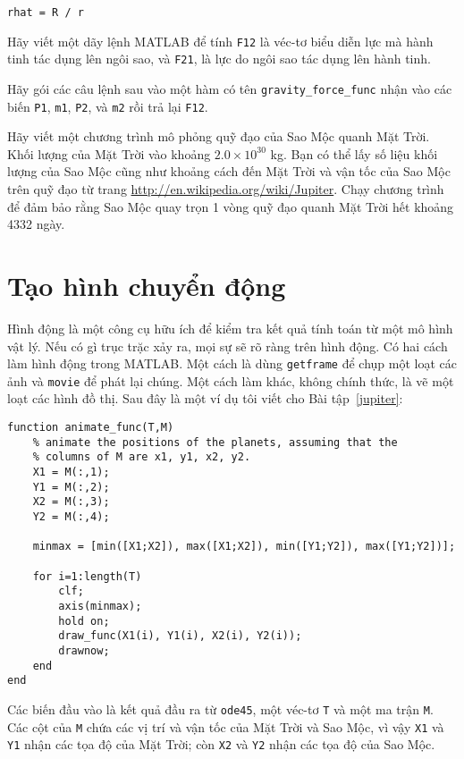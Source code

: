 \documentclass[12pt]{book}
\begin{document}
\begin{verbatim}
rhat = R / r
\end{verbatim}

\begin{ex}
Hãy viết một dãy lệnh MATLAB để tính {\tt F12} là véc-tơ biểu diễn 
lực mà hành tinh tác dụng lên ngôi sao, và {\tt F21}, là lực do 
ngôi sao tác dụng lên hành tinh.
\end{ex}

\begin{ex}
Hãy gói các câu lệnh sau vào một hàm có tên \verb#gravity_force_func#
nhận vào các biến {\tt P1}, {\tt m1}, {\tt P2}, và {\tt m2} rồi trả lại {\tt F12}.
\end{ex}

\begin{ex}
\label{jupiter}
Hãy viết một chương trình  mô phỏng quỹ đạo của Sao Mộc quanh
Mặt Trời. Khối lượng của Mặt Trời vào khoảng $2.0 \times 10^{30}$ kg. 
Bạn có thể lấy số liệu khối lượng của Sao Mộc cũng như khoảng cách
đến Mặt Trời và vận tốc của Sao Mộc trên quỹ đạo từ trang 
\url{http://en.wikipedia.org/wiki/Jupiter}. Chạy chương trình để
đảm bảo rằng Sao Mộc quay trọn 1 vòng quỹ đạo quanh Mặt Trời
hết khoảng 4332 ngày.
\end{ex}


\section{Tạo hình chuyển động}

Hình động là một công cụ hữu ích để kiểm tra kết quả tính toán từ
một mô hình vật lý. Nếu có gì trục trặc xảy ra, mọi sự sẽ rõ ràng
trên hình động. Có hai cách làm hình động trong MATLAB. Một cách
là dùng {\tt getframe} để chụp một loạt các ảnh và {\tt movie} để
phát lại chúng. Một cách làm khác, không chính thức, là vẽ một loạt
các hình đồ thị. Sau đây là một ví dụ tôi viết cho Bài tập~\ref{jupiter}:

\begin{verbatim}
function animate_func(T,M)
    % animate the positions of the planets, assuming that the
    % columns of M are x1, y1, x2, y2.
    X1 = M(:,1);
    Y1 = M(:,2);
    X2 = M(:,3);
    Y2 = M(:,4);

    minmax = [min([X1;X2]), max([X1;X2]), min([Y1;Y2]), max([Y1;Y2])];

    for i=1:length(T)
        clf;
        axis(minmax);
        hold on;
        draw_func(X1(i), Y1(i), X2(i), Y2(i));
        drawnow;
    end
end
\end{verbatim}
%
Các biến đầu vào là kết quả đầu ra từ {\tt ode45}, một véc-tơ
{\tt T} và một ma trận {\tt M}. Các cột của {\tt M} chứa các
vị trí và vận tốc của Mặt Trời và Sao Mộc, vì vậy
{\tt X1} và {\tt Y1} nhận các tọa độ của Mặt Trời; còn
{\tt X2} và {\tt Y2} nhận các tọa độ của Sao Mộc.
\end{document}
